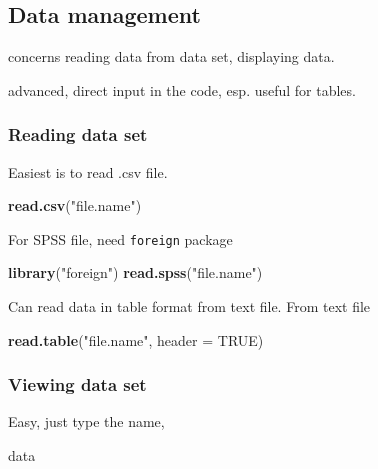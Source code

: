\documentclass[]{book}
\newenvironment{Shaded}{\begin{snugshade}}{\end{snugshade}}
\newcommand{\KeywordTok}[1]{\textcolor[rgb]{0.13,0.29,0.53}{\textbf{{#1}}}}
\newcommand{\DataTypeTok}[1]{\textcolor[rgb]{0.13,0.29,0.53}{{#1}}}
\newcommand{\StringTok}[1]{\textcolor[rgb]{0.31,0.60,0.02}{{#1}}}
\newcommand{\OtherTok}[1]{\textcolor[rgb]{0.56,0.35,0.01}{{#1}}}
\newcommand{\NormalTok}[1]{{#1}}
\theoremstyle{definition}
\theoremstyle{definition}
\theoremstyle{remark}
\begin{document}
\subsection{Data management}\label{data-management}

concerns reading data from data set, displaying data.

advanced, direct input in the code, esp. useful for tables.

\subsubsection{Reading data set}\label{reading-data-set}

Easiest is to read .csv file.

\begin{Shaded}
\begin{Highlighting}[]
\KeywordTok{read.csv}\NormalTok{(}\StringTok{"file.name"}\NormalTok{)}
\end{Highlighting}
\end{Shaded}

For SPSS file, need \texttt{foreign} package

\begin{Shaded}
\begin{Highlighting}[]
\KeywordTok{library}\NormalTok{(}\StringTok{"foreign"}\NormalTok{)}
\KeywordTok{read.spss}\NormalTok{(}\StringTok{"file.name"}\NormalTok{)}
\end{Highlighting}
\end{Shaded}

Can read data in table format from text file. From text file

\begin{Shaded}
\begin{Highlighting}[]
\KeywordTok{read.table}\NormalTok{(}\StringTok{"file.name"}\NormalTok{, }\DataTypeTok{header =} \OtherTok{TRUE}\NormalTok{)}
\end{Highlighting}
\end{Shaded}

\subsubsection{Viewing data set}\label{viewing-data-set}

Easy, just type the name,

\begin{Shaded}
\begin{Highlighting}[]
\NormalTok{data}
\end{Highlighting}
\end{Shaded}
\end{document}
